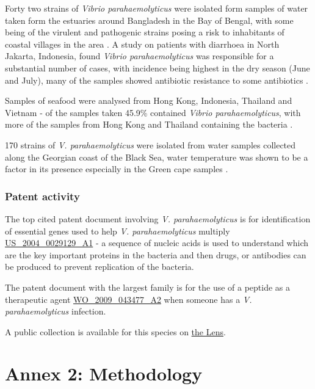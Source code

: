 \documentclass[]{book}
\theoremstyle{definition}
\theoremstyle{definition}
\theoremstyle{definition}
\theoremstyle{remark}
\begin{document}
Forty two strains of \emph{Vibrio parahaemolyticus} were isolated form
samples of water taken form the estuaries around Bangladesh in the Bay
of Bengal, with some being of the virulent and pathogenic strains posing
a risk to inhabitants of coastal villages in the area \citep{Alam_2009}.
A study on patients with diarrhoea in North Jakarta, Indonesia, found
\emph{Vibrio parahaemolyticus} was responsible for a substantial number
of cases, with incidence being highest in the dry season (June and
July), many of the samples showed antibiotic resistance to some
antibiotics \citep{Lesmana_2001}.

Samples of seafood were analysed from Hong Kong, Indonesia, Thailand and
Vietnam - of the samples taken 45.9\% contained \emph{Vibrio
parahaemolyticus}, with more of the samples from Hong Kong and Thailand
containing the bacteria \citep{Wong_1999}.

170 strains of \emph{V. parahaemolyticus} were isolated from water
samples collected along the Georgian coast of the Black Sea, water
temperature was shown to be a factor in its presence especially in the
Green cape samples \citep{Haley_2014}.

\hypertarget{patent-activity-9}{%
\subsection{Patent activity}\label{patent-activity-9}}

The top cited patent document involving \emph{V. parahaemolyticus} is
for identification of essential genes used to help \emph{V.
parahaemolyticus} multiply
\href{https://www.lens.org/lens/patent/US_2004_0029129_A1}{US\_2004\_0029129\_A1}
- a sequence of nucleic acids is used to understand which are the key
important proteins in the bacteria and then drugs, or antibodies can be
produced to prevent replication of the bacteria.

The patent document with the largest family is for the use of a peptide
as a therapeutic agent
\href{https://www.lens.org/lens/patent/WO_2009_043477_A2}{WO\_2009\_043477\_A2}
when someone has a \emph{V. parahaemolyticus} infection.

A public collection is available for this species on
\href{https://www.lens.org/lens/collection/24760}{the Lens}.

\hypertarget{method}{%
\chapter{Annex 2: Methodology}\label{method}}
\end{document}
